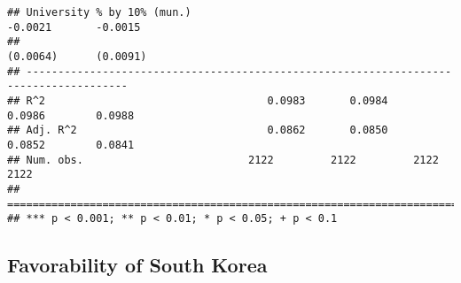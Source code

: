 \documentclass[
]{article}
\begin{document}
\begin{verbatim}
## University % by 10% (mun.)                                     -0.0021       -0.0015  
##                                                                (0.0064)      (0.0091) 
## --------------------------------------------------------------------------------------
## R^2                                   0.0983       0.0984       0.0986        0.0988  
## Adj. R^2                              0.0862       0.0850       0.0852        0.0841  
## Num. obs.                          2122         2122         2122          2122       
## ======================================================================================
## *** p < 0.001; ** p < 0.01; * p < 0.05; + p < 0.1
\end{verbatim}

\hypertarget{favorability-of-south-korea-2}{%
\subsection{Favorability of South
Korea}\label{favorability-of-south-korea-2}}
\end{document}
